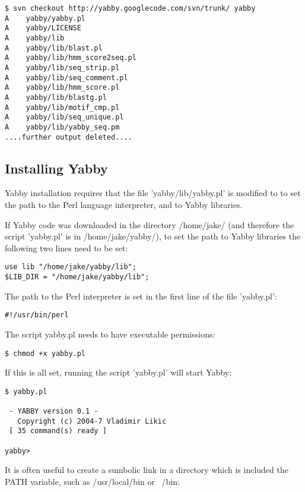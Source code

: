 \begin{verbatim}
$ svn checkout http://yabby.googlecode.com/svn/trunk/ yabby
A    yabby/yabby.pl
A    yabby/LICENSE
A    yabby/lib
A    yabby/lib/blast.pl
A    yabby/lib/hmm_score2seq.pl
A    yabby/lib/seq_strip.pl
A    yabby/lib/seq_comment.pl
A    yabby/lib/hmm_score.pl
A    yabby/lib/blastg.pl
A    yabby/lib/motif_cmp.pl
A    yabby/lib/seq_unique.pl
A    yabby/lib/yabby_seq.pm
....further output deleted....
\end{verbatim}

\subsection{Installing Yabby}

Yabby installation requires that the file 'yabby/lib/yabby.pl' is
modified to to set the path to the Perl language interpreter,
and to Yabby libraries.

If Yabby code was downloaded in the directory /home/jake/ (and
therefore the script 'yabby.pl' is in /home/jake/yabby/), to set
the path to Yabby libraries the following two lines need to be
set: 

\begin{verbatim}
use lib "/home/jake/yabby/lib";
$LIB_DIR = "/home/jake/yabby/lib";
\end{verbatim}

The path to the Perl interpreter is set in the first line of the
file 'yabby.pl':

\begin{verbatim}
#!/usr/bin/perl
\end{verbatim}

The script yabby.pl needs to have executable permissions:

\begin{verbatim}
$ chmod +x yabby.pl
\end{verbatim}

If this is all set, running the script 'yabby.pl' will start Yabby:

\begin{verbatim}
$ yabby.pl

 - YABBY version 0.1 - 
   Copyright (c) 2004-7 Vladimir Likic
 [ 35 command(s) ready ]

yabby>
\end{verbatim}

It is often useful to create a sumbolic link in a directory which
is included the PATH variable, such as /usr/local/bin or ~/bin:

